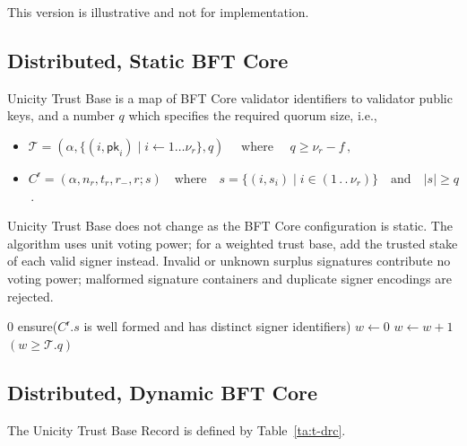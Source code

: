 This version is illustrative and not for implementation.


\subsection{Distributed, Static BFT Core}

Unicity Trust Base is a map of BFT Core validator identifiers to validator public keys, and a number $q$ which specifies the required quorum size, i.e.,
\begin{itemize}
    \item $\mathcal{T} = (\alpha, \{ (i, \mathsf{pk}_i)  \mid i \gets 1 \ldots \nu_r  \}, q) \quad\text{ where }\quad q \ge \nu_r - f \,,$
    \item $C^\mathsf{r} = (\alpha, n_r, t_r, r_-, r; s) \quad \text{where} \quad s = \{(i, s_i) \mid i \in (1 \,.\,.\, \nu_r)  \}  \quad \text{and} \quad \lvert s \rvert \ge q$\,. \\
\end{itemize}

Unicity Trust Base does not change as the BFT Core configuration is static. The algorithm uses unit voting power; for a weighted trust base, add the trusted stake of each valid signer instead. Invalid or unknown surplus signatures contribute no voting power; malformed signature containers and duplicate signer encodings are rejected.

\begin{algorithmic}[0]
        \State \Return $0$
    \EndIf
    \State ensure($C^\mathsf{r}.s$ is well formed and has distinct signer identifiers)
    \State $w \gets 0$
        \State $w \gets w+1$
      \EndIf
    \EndFor
    \State \Return $(w\ge\mathcal{T}.q)$
  \EndFunction
\end{algorithmic}


\subsection{Distributed, Dynamic BFT Core}\label{sec:ddrc}

The Unicity Trust Base Record is defined by Table~\ref{ta:t-drc}.

